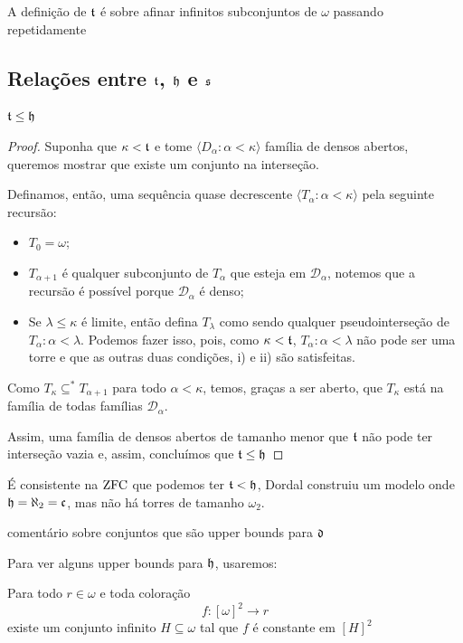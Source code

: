 A definição de $\mathfrak{t}$ é sobre afinar infinitos subconjuntos de $\omega$ passando repetidamente 

\subsection{Relações entre \texorpdfstring{$\mathfrak{t}$, $\mathfrak{h}$ e $\mathfrak{s}$}{t, h e s}}

\begin{proposition}
    $\mathfrak{t} \leq \mathfrak{h}$
\end{proposition}
\begin{proof}
    Suponha que $\kappa < \mathfrak{t}$ e tome $\langle D_\alpha : \alpha < \kappa \rangle$ família de densos abertos, queremos mostrar que existe um conjunto na interseção. 

    Definamos, então, uma sequência quase decrescente $\langle T_\alpha : \alpha < \kappa \rangle$ pela seguinte recursão: 
    \begin{itemize}
        \item $T_0 = \omega$;
        \item $T_{\alpha + 1}$ é qualquer subconjunto de $T_\alpha$ que esteja em $\mathcal D_\alpha$, notemos que a recursão é possível porque $\mathcal D_\alpha$ é denso;
        \item Se $\lambda \leq \kappa$ é limite, então defina $T_\lambda$ como sendo qualquer pseudointerseção de ${T_\alpha : \alpha < \lambda}$. Podemos fazer isso, pois, como $\kappa < \mathfrak{t}$, ${T_\alpha : \alpha < \lambda}$ não pode ser uma torre e que as outras duas condições, i) e ii) são satisfeitas.
    \end{itemize}
    Como $T_\kappa \subseteq^* T_{\alpha + 1}$ para todo $\alpha < \kappa$, temos, graças a ser aberto, que $T_\kappa$ está na família de todas famílias $\mathcal D_\alpha$. 

    Assim, uma família de densos abertos de tamanho menor que $\mathfrak{t}$ não pode ter interseção vazia e, assim, concluímos que $\mathfrak{t} \leq \mathfrak{h}$
\end{proof}

É consistente na $\operatorname{ZFC}$ que podemos ter $\mathfrak{t} < \mathfrak{h}$, Dordal construiu um modelo onde $\mathfrak{h} = \aleph_2 = \mathfrak{c}$, mas não há torres de tamanho $\omega_2$.

\pending comentário sobre conjuntos que são upper bounds para $\mathfrak{d}$

Para ver alguns upper bounds para $\mathfrak{h}$, usaremos:

\begin{theorem} [de Ramsey]
    Para todo $r\in \omega$ e toda coloração
    $$
    f: [\omega]^2 \to r
    $$
    existe um conjunto infinito $H \subseteq \omega$ tal que $f$ é constante em $[H]^2$
\end{theorem}


